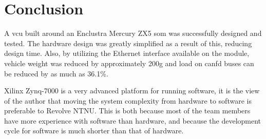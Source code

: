 \section{Conclusion}


A \acrlong{vcu} built around an Enclustra Mercury ZX5 \acrlong{som} was successfully designed and tested. The hardware design was greatly simplified as a result of this, reducing design time. Also, by utilizing the Ethernet interface available on the module, vehicle weight was reduced by approximately 200\si{\gram} and load on \acrshort{canfd} buses can be reduced by as much as 36.1\%.

Xilinx Zynq-7000 is a very advanced platform for running software, it is the view of the author that moving the system complexity from hardware to software is preferable to Revolve NTNU. This is both because most of the team members have more experience with software than hardware, and because the development cycle for software is much shorter than that of hardware.


